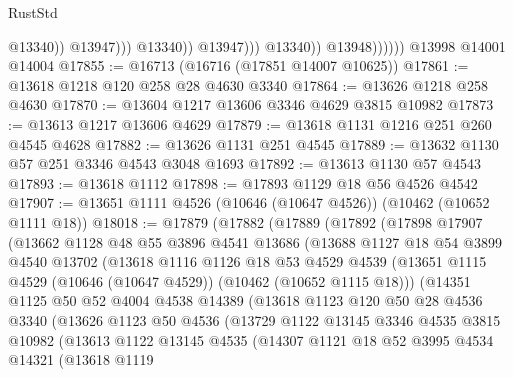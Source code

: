 \begin{lexlean}{RustStd}
\begin{coremodule}
                                        @13340))
                                    @13947)))
                              @13340))
                          @13947)))
                    @13340))
                @13948))))))
    @13998
    @14001
    @14004
@17855 := @16713 (@16716 (@17851 @14007 @10625))
@17861 := @13618 @1218 @120 @258 @28 @4630 @3340
@17864 := @13626 @1218 @258 @4630
@17870 := @13604 @1217 @13606 @3346 @4629 @3815 @10982
@17873 := @13613 @1217 @13606 @4629
@17879 := @13618 @1131 @1216 @251 @260 @4545 @4628
@17882 := @13626 @1131 @251 @4545
@17889 := @13632 @1130 @57 @251 @3346 @4543 @3048 @1693
@17892 := @13613 @1130 @57 @4543
@17893 := @13618 @1112
@17898 := @17893 @1129 @18 @56 @4526 @4542
@17907 := @13651 @1111 @4526 (@10646 (@10647 @4526)) (@10462 (@10652 @1111 @18))
@18018 := @17879
    (@17882
      (@17889
        (@17892
          (@17898
            @17907
            (@13662
              @1128
              @48
              @55
              @3896
              @4541
              @13686
              (@13688
                @1127
                @18
                @54
                @3899
                @4540
                @13702
                (@13618
                  @1116
                  @1126
                  @18
                  @53
                  @4529
                  @4539
                  (@13651 @1115 @4529 (@10646 (@10647 @4529)) (@10462 (@10652 @1115 @18)))
                  (@14351
                    @1125
                    @50
                    @52
                    @4004
                    @4538
                    @14389
                    (@13618
                      @1123
                      @120
                      @50
                      @28
                      @4536
                      @3340
                      (@13626
                        @1123
                        @50
                        @4536
                        (@13729
                          @1122
                          @13145
                          @3346
                          @4535
                          @3815
                          @10982
                          (@13613
                            @1122
                            @13145
                            @4535
                            (@14307
                              @1121
                              @18
                              @52
                              @3995
                              @4534
                              @14321
                              (@13618
                                @1119

\end{coremodule}
\end{lexlean}
